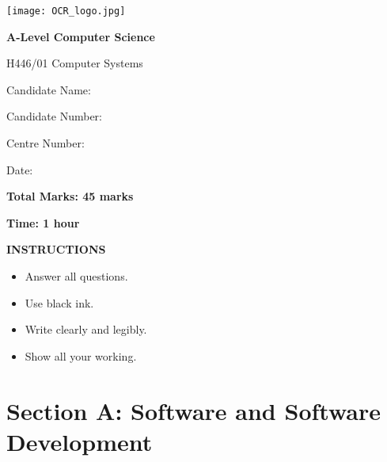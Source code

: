 \documentclass[a4paper,12pt]{article}
\begin{document}
\begin{titlepage}
\begin{center}
\texttt{[image: OCR\_logo.jpg]}

\vspace{2cm}

\huge{\textbf{A-Level Computer Science}}

\Large{H446/01 Computer Systems}

\vspace{1cm}

\large{Candidate Name: \underline{\hspace{6cm}}}

\large{Candidate Number: \underline{\hspace{6cm}}}

\large{Centre Number: \underline{\hspace{6cm}}}

\vspace{1cm}

\large{Date: \underline{\hspace{6cm}}}

\vspace{2cm}

\large{\textbf{Total Marks: 45 marks}}

\large{\textbf{Time: 1 hour}}

\vspace{2cm}

\textbf{INSTRUCTIONS}
\begin{itemize}[leftmargin=*]
\item Answer all questions.
\item Use black ink.
\item Write clearly and legibly.
\item Show all your working.
\end{itemize}

\end{center}
\end{titlepage}

\newpage

\section*{Section A: Software and Software Development}
\end{document}
